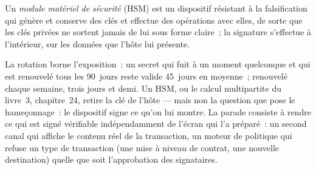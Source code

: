 \begin{definition}\label{def:pl:security:hsm}
Un \emph{module matériel de sécurité} (HSM) est un dispositif résistant à la falsification qui génère et conserve des clés et
effectue des opérations avec elles, de sorte que les clés privées ne sortent jamais de lui sous forme claire~; la signature s'effectue à l'intérieur, sur les données que l'hôte lui présente.
\end{definition}

La rotation borne l'exposition~: un secret qui fuit à un moment quelconque et qui est renouvelé tous les 90~jours reste valide 45~jours en moyenne~; renouvelé chaque semaine,
trois jours et demi. Un HSM, ou le calcul multipartite du livre~3, chapitre~24, retire la clé de l'hôte --- mais non la question que pose
le hameçonnage~: le dispositif signe ce qu'on lui montre. La parade consiste à rendre ce qui est signé vérifiable indépendamment de l'écran qui l'a préparé~:
un second canal qui affiche le contenu réel de la transaction, un moteur de politique qui refuse un type de transaction (une mise à niveau de contrat, une nouvelle
destination) quelle que soit l'approbation des signataires.


